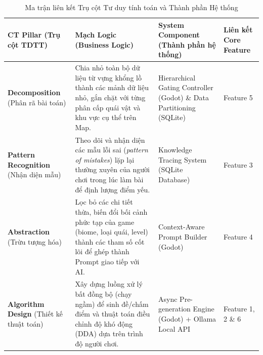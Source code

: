\begin{table}[H]
\centering
\caption{Ma trận liên kết Trụ cột Tư duy tính toán và Thành phần Hệ thống}
\label{tab:ct_framework_matrix}
\small
\noindent\begin{tabularx}{\textwidth}{|>{\raggedright\arraybackslash}p{2.8cm}|X|>{\raggedright\arraybackslash}p{3.2cm}|>{\raggedright\arraybackslash}p{2.2cm}|}
\hline
\textbf{CT Pillar (Trụ cột TDTT)} & \textbf{Mạch Logic (Business Logic)} & \textbf{System Component (Thành phần hệ thống)} & \textbf{Liên kết Core Feature} \\ \hline

\textbf{Decomposition} \newline (Phân rã bài toán) & 
Chia nhỏ toàn bộ dữ liệu từ vựng khổng lồ thành các mảnh dữ liệu nhỏ, gắn chặt với từng phân cấp quái vật và khu vực cụ thể trên Map. & 
Hierarchical Gating Controller (Godot) \& Data Partitioning (SQLite) & 
Feature 5 \\ \hline

\textbf{Pattern Recognition} \newline (Nhận diện mẫu) & 
Theo dõi và nhận diện các mẫu lỗi sai (\textit{pattern of mistakes}) lặp lại thường xuyên của người chơi trong lúc làm bài để định lượng điểm yếu. & 
Knowledge Tracing System (SQLite Database) & 
Feature 3 \\ \hline

\textbf{Abstraction} \newline (Trừu tượng hóa) & 
Lọc bỏ các chi tiết thừa, biến đổi bối cảnh phức tạp của game (biome, loại quái, level) thành các tham số cốt lõi để ghép thành Prompt giao tiếp với AI. & 
Context-Aware Prompt Builder (Godot) & 
Feature 4 \\ \hline

\textbf{Algorithm Design} \newline (Thiết kế thuật toán) & 
Xây dựng luồng xử lý bất đồng bộ (chạy ngầm) để sinh đề/chấm điểm và thuật toán điều chỉnh độ khó động (DDA) dựa trên trình độ người chơi. & 
Async Pre-generation Engine (Godot) + Ollama Local API & 
Feature 1, 2 \& 6 \\ \hline
\end{tabularx}
\end{table}

